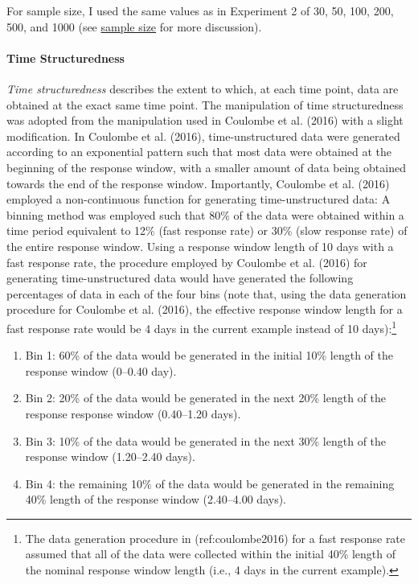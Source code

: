 \documentclass[
12pt, %
twoside,
english]{guelphthesis}
\begin{document}
For sample size, I used the same values as in Experiment 2 of 30, 50, 100, 200, 500, and 1000 (see \protect\hyperlink{sample-size}{sample size} for more discussion).

\hypertarget{time-structuredness-1}{%
\paragraph{Time Structuredness}\label{time-structuredness-1}}

\emph{Time structuredness} describes the extent to which, at each time point, data are obtained at the exact same time point. The manipulation of time structuredness was adopted from the manipulation used in Coulombe et al. (2016) with a slight modification. In Coulombe et al. (2016), time-unstructured data were generated according to an exponential pattern such that most data were obtained at the beginning of the response window, with a smaller amount of data being obtained towards the end of the response window. Importantly, Coulombe et al. (2016) employed a non-continuous function for generating time-unstructured data: A binning method was employed such that 80\% of the data were obtained within a time period equivalent to 12\% (fast response rate) or 30\% (slow response rate) of the entire response window. Using a response window length of 10 days with a fast response rate, the procedure employed by Coulombe et al. (2016) for generating time-unstructured data would have generated the following percentages of data in each of the four bins (note that, using the data generation procedure for Coulombe et al. (2016), the effective response window length for a fast response rate would be 4 days in the current example instead of 10 days):\footnote{The data generation procedure in (ref:coulombe2016) for a fast response rate assumed that all of the data were collected within the initial 40\% length of the nominal response window length (i.e., 4 days in the current example).}
\begin{enumerate}
\def\labelenumi{\arabic{enumi})}
\tightlist
\item
  Bin 1: 60\% of the data would be generated in the initial 10\% length of the response window (0--0.40 day).
\item
  Bin 2: 20\% of the data would be generated in the next 20\% length of the response response window (0.40--1.20 days).
\item
  Bin 3: 10\% of the data would be generated in the next 30\% length of the response window (1.20--2.40 days).
\item
  Bin 4: the remaining 10\% of the data would be generated in the remaining 40\% length of the response window (2.40--4.00 days).
\end{enumerate}
\end{document}
